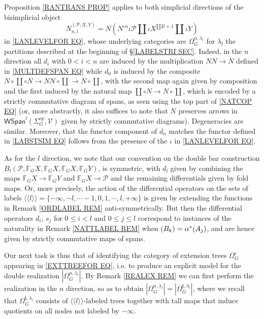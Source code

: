 \documentclass[a4paper,10pt
,draft
]{article}%
\numberwithin{equation}{section}
\numberwithin{figure}{section}
\theoremstyle{definition} %
\newcommand{\1}{\ensuremath{\mathbbm 1}}%
\begin{document}
Proposition \ref{RANTRANS PROP} applies to both simplicial directions of 
the bisimplicial object
\begin{equation}\label{BISIMP EQ}
	N^{(\mathcal P,X,Y)}_{n,l} =
	N ( N^{\circ n} \iota \mathcal{P} \amalg
	\iota X^{\amalg 2l+1} \amalg \iota Y)
\end{equation}
in \eqref{LANLEVELFOR EQ},
whose underlying categories are 
$\Omega_G^{n,\lambda_l}$
for $\lambda_l$ the partitions described at the beginning of
\S \ref{LABELSTRI SEC}.
Indeed, in the $n$ direction all $d_i$ with $0 < i < n$
are induced by the multiplication $NN \to N$ defined in 
\eqref{MULTDEFSPAN EQ} while $d_0$
is induced by the composite
$N \circ \coprod \circ N \to N N \circ \coprod \to N \circ \coprod$, with the second map again given by composition
and the first induced
by the natural map 
$\coprod \circ N \to N \circ \coprod$, which is encoded by a strictly commutative diagram of spans,
as seen using the top part of \eqref{NATCOP EQ}
(or, more abstractly, 
it also suffices to note that 
$N$ preserves arrows in $\mathsf{WSpan}^l(\Sigma_G^{op},\mathcal{V})$ given by strictly commutative diagrams).
Degeneracies are similar.
Moreover, that the functor component of $d_n$
matches the functor defined in \eqref{LABSTSIM EQ}
follows from the presence of the $\iota$ in \eqref{LANLEVELFOR EQ}.

As for the $l$ direction, we note that our convention on 
the double bar construction 
$B_l(\mathcal{P}, \mathbb{F}_G X, \mathbb{F}_G X, \mathbb{F}_G X, \mathbb{F}_G Y)$,
is symmetric, 
with $d_l$ given by combining the maps
$\mathbb{F}_G X \to \mathbb{F}_G Y$ 
and 
$\mathbb{F}_G X \to \mathcal{P}$
and the remaining differentials given by fold maps.
Or, more precisely, the action of the differential operators
on the sets of labels
$\langle \langle l \rangle \rangle = 
\{-\infty,-l, \cdots -1,0,1,\cdots,l,+\infty\}$
is given by extending the functions in 
Remark \ref{ORDLABEL REM} anti-symmetrically.
But then the differential operators 
$d_i$, $s_j$ for $0\leq i<l$ and $0\leq j \leq l$
correspond to instances of the naturality in 
Remark \ref{NATTLABEL REM}
when $(B_k) =\alpha^{\**}(A_j)$,
and are hence given by strictly commutative maps of spans.

Our next task is thus that of identifying the category of extension trees $\Omega_G^e$ appearing
in \eqref{EXTTREEFOR EQ},
i.e. to produce an explicit model for the double realization
$|\Omega_G^{n,\lambda_l}|$.
By Remark \ref{REALEX REM}
we can first perform the realization in the $n$ direction, so as to obtain
$|\Omega_G^{n,\lambda_l}|=|\Omega_G^{\mathsf{t},\lambda_l}|$,
where we recall that 
$\Omega_G^{\mathsf{t},\lambda_l}$
consists of $\langle \langle l \rangle \rangle$-labeled trees
together with tall maps that induce quotients on all nodes not labeled by $-\infty$.
\end{document}
